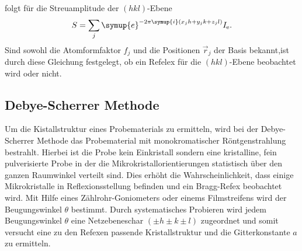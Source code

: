 folgt für die Streuamplitude der $(hkl)$-Ebene
\begin{align}
  S=\sum_j \symup{e}^{-2\pi \symup{i}(x_jh+y_jk+z_jl)}  I_\mathrm{e}. \label{eqn:Streu}
\end{align}
Sind sowohl die Atomformfaktor $f_j$ und die Positionen $\vec{r}_j$ der Basis bekannt,ist durch diese Gleichung festgelegt,
ob ein Refelex für die $(hkl)$-Ebene beobachtet wird oder nicht.

\subsection{Debye-Scherrer Methode}
\label{subsec:Methoden}
Um die Kistallstruktur eines Probematerials
zu ermitteln, wird bei der Debye-Scherrer Methode
das Probematerial mit monokromatischer
Röntgenstrahlung bestrahlt.
Hierbei ist die Probe kein
Einkristall sondern eine
kristalline, fein pulverisierte Probe
in der die Mikrokristallorientierungen statistisch
über den ganzen Raumwinkel verteilt sind.
Dies erhöht die Wahrscheinlichkeit, dass
einige Mikrokristalle in Reflexionsstellung
befinden und ein Bragg-Refex beobachtet wird.
Mit Hilfe eines
Zählrohr-Goniometers oder
einems Filmstreifens wird der Beugungswinkel $\theta$
bestimmt. Durch systematisches Probieren wird
jedem Beugungswinkel $\theta$ eine Netzebeneschar
${(\pm h \pm k \pm l)}$ zugeordnet und somit versucht
eine zu den Refexen passende Kristallstruktur und die Gitterkonstante $a$
zu ermitteln.
\cite{sample}

